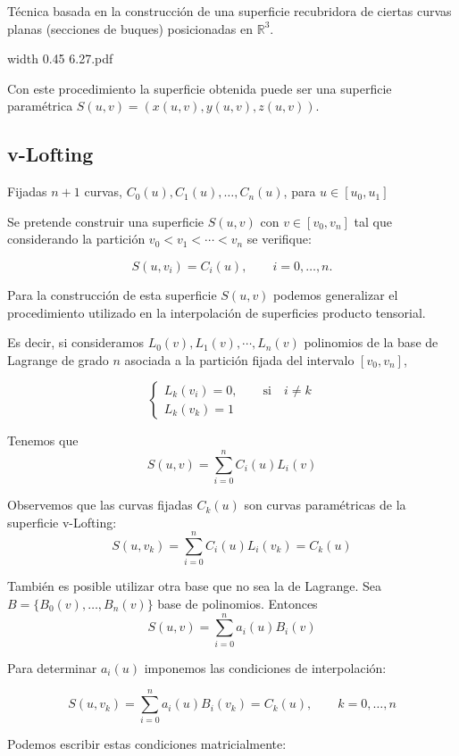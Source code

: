 \documentclass[twoside]{report}
\newcommand{\colocapdf}[2]{\quad\pdfimage width #2 {#1.pdf}}
\begin{document}
T\'{e}cnica basada en la construcci\'{o}n de una superficie recubridora de ciertas curvas planas (secciones de buques) posicionadas en $\mathbb{R}^3.$

\begin{center}
\colocapdf{6.27}{0.45\textwidth}
\end{center}

Con este procedimiento la superficie obtenida puede ser una superficie param\'{e}trica $S(u,v)=(x(u,v),y(u,v),z(u,v))$.

\subsection{v-Lofting}

Fijadas $n+1$ curvas, $C_0(u),C_1(u), \ldots, C_n(u)$,  para $u\in [u_0,u_1]$

Se pretende construir una superficie $S(u,v)$ con  $v\in [v_0,v_n]$ tal que considerando la partici\'{o}n $v_0<v_1<\cdots <v_n$
se verifique:

$$S(u,v_i)=C_i(u),\quad \quad i=0,\ldots,n.$$

Para la construcci\'{o}n de esta superficie $S(u,v)$ podemos generalizar el procedimiento utilizado en la interpolaci\'{o}n de superficies producto tensorial.

Es decir, si consideramos $L_0(v), L_1(v), \cdots,L_n(v)$ polinomios de la base  de Lagrange de grado $n$ asociada a la partici\'{o}n fijada del intervalo $[v_0,v_n]$,

$$\left\{ \begin{array}{l}
L_k(v_i)=0,\quad \quad \mbox{si} \quad  i\neq k\\
L_k(v_k)=1
\end{array} \right.$$

Tenemos que
$$S(u,v)=\sum_{i=0}^n C_i(u) L_i(v)$$

Observemos que las curvas fijadas $C_k(u)$ son curvas param\'{e}tricas de la superficie v-Lofting:
$$S(u,v_k)=\sum_{i=0}^n C_i(u) L_i(v_k)=C_k(u)$$

Tambi\'{e}n es posible utilizar otra base que no sea la de Lagrange. Sea  $B=\{B_0(v), \ldots,B_n(v)\}$  base de polinomios. Entonces
$$S(u,v)=\sum_{i=0}^n a_i(u) B_i(v)$$

Para determinar $a_i(u)$ imponemos las condiciones de interpolaci\'{o}n:

$$S(u,v_k)=\sum_{i=0}^n a_i(u) B_i(v_k)=C_k(u), \quad \quad k=0,\ldots,n $$

Podemos escribir estas condiciones matricialmente:
\end{document}
